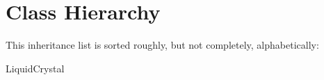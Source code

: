 \section{Class Hierarchy}
This inheritance list is sorted roughly, but not completely, alphabetically\+:\begin{DoxyCompactList}
\item Liquid\+Crystal\begin{DoxyCompactList}
\item {}
\end{DoxyCompactList}
\end{DoxyCompactList}
